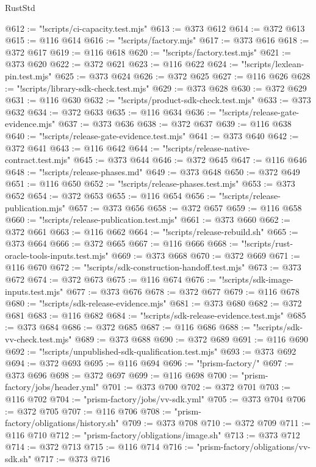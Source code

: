 \begin{lexlean}{RustStd}
\begin{coremodule}
@612 := "!scripts/ci-capacity.test.mjs"
@613 := @373 @612
@614 := @372 @613
@615 := @116 @614
@616 := "!scripts/factory.mjs"
@617 := @373 @616
@618 := @372 @617
@619 := @116 @618
@620 := "!scripts/factory.test.mjs"
@621 := @373 @620
@622 := @372 @621
@623 := @116 @622
@624 := "!scripts/lexlean-pin.test.mjs"
@625 := @373 @624
@626 := @372 @625
@627 := @116 @626
@628 := "!scripts/library-sdk-check.test.mjs"
@629 := @373 @628
@630 := @372 @629
@631 := @116 @630
@632 := "!scripts/product-sdk-check.test.mjs"
@633 := @373 @632
@634 := @372 @633
@635 := @116 @634
@636 := "!scripts/release-gate-evidence.mjs"
@637 := @373 @636
@638 := @372 @637
@639 := @116 @638
@640 := "!scripts/release-gate-evidence.test.mjs"
@641 := @373 @640
@642 := @372 @641
@643 := @116 @642
@644 := "!scripts/release-native-contract.test.mjs"
@645 := @373 @644
@646 := @372 @645
@647 := @116 @646
@648 := "!scripts/release-phases.md"
@649 := @373 @648
@650 := @372 @649
@651 := @116 @650
@652 := "!scripts/release-phases.test.mjs"
@653 := @373 @652
@654 := @372 @653
@655 := @116 @654
@656 := "!scripts/release-publication.mjs"
@657 := @373 @656
@658 := @372 @657
@659 := @116 @658
@660 := "!scripts/release-publication.test.mjs"
@661 := @373 @660
@662 := @372 @661
@663 := @116 @662
@664 := "!scripts/release-rebuild.sh"
@665 := @373 @664
@666 := @372 @665
@667 := @116 @666
@668 := "!scripts/rust-oracle-tools-inputs.test.mjs"
@669 := @373 @668
@670 := @372 @669
@671 := @116 @670
@672 := "!scripts/sdk-construction-handoff.test.mjs"
@673 := @373 @672
@674 := @372 @673
@675 := @116 @674
@676 := "!scripts/sdk-image-inputs.test.mjs"
@677 := @373 @676
@678 := @372 @677
@679 := @116 @678
@680 := "!scripts/sdk-release-evidence.mjs"
@681 := @373 @680
@682 := @372 @681
@683 := @116 @682
@684 := "!scripts/sdk-release-evidence.test.mjs"
@685 := @373 @684
@686 := @372 @685
@687 := @116 @686
@688 := "!scripts/sdk-vv-check.test.mjs"
@689 := @373 @688
@690 := @372 @689
@691 := @116 @690
@692 := "!scripts/unpublished-sdk-qualification.test.mjs"
@693 := @373 @692
@694 := @372 @693
@695 := @116 @694
@696 := "!prism-factory/"
@697 := @373 @696
@698 := @372 @697
@699 := @116 @698
@700 := "prism-factory/jobs/header.yml"
@701 := @373 @700
@702 := @372 @701
@703 := @116 @702
@704 := "prism-factory/jobs/vv-sdk.yml"
@705 := @373 @704
@706 := @372 @705
@707 := @116 @706
@708 := "prism-factory/obligations/history.sh"
@709 := @373 @708
@710 := @372 @709
@711 := @116 @710
@712 := "prism-factory/obligations/image.sh"
@713 := @373 @712
@714 := @372 @713
@715 := @116 @714
@716 := "prism-factory/obligations/vv-sdk.sh"
@717 := @373 @716

\end{coremodule}
\end{lexlean}
